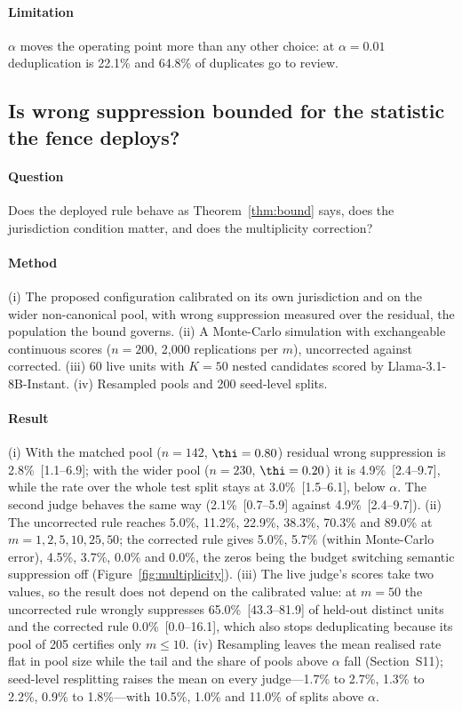 \paragraph{Limitation} $\alpha$ moves the operating point more than any other choice: at $\alpha=0.01$ deduplication is 22.1\% and 64.8\% of duplicates go to review.

\subsection{Is wrong suppression bounded for the statistic the fence deploys?}\label{sec:res-bound}

\paragraph{Question} Does the deployed rule behave as Theorem~\ref{thm:bound} says, does the jurisdiction condition matter, and does the multiplicity correction?

\paragraph{Method} (i) The proposed configuration calibrated on its own jurisdiction and on the wider non-canonical pool, with wrong suppression measured over the residual, the population the bound governs. (ii) A Monte-Carlo simulation with exchangeable continuous scores ($n=200$, 2,000 replications per $m$), uncorrected against corrected. (iii) 60 live units with $K=50$ nested candidates scored by Llama-3.1-8B-Instant. (iv) Resampled pools and 200 seed-level splits.

\paragraph{Result} (i) With the matched pool ($n=142$, $\thi=0.80$) residual wrong suppression is 2.8\%~[1.1--6.9]; with the wider pool ($n=230$, $\thi=0.20$) it is 4.9\%~[2.4--9.7], while the rate over the whole test split stays at 3.0\%~[1.5--6.1], below $\alpha$. The second judge behaves the same way (2.1\%~[0.7--5.9] against 4.9\%~[2.4--9.7]). (ii) The uncorrected rule reaches 5.0\%, 11.2\%, 22.9\%, 38.3\%, 70.3\% and 89.0\% at $m=1,2,5,10,25,50$; the corrected rule gives 5.0\%, 5.7\% (within Monte-Carlo error), 4.5\%, 3.7\%, 0.0\% and 0.0\%, the zeros being the budget switching semantic suppression off (Figure~\ref{fig:multiplicity}). (iii) The live judge's scores take two values, so the result does not depend on the calibrated value: at $m=50$ the uncorrected rule wrongly suppresses 65.0\%~[43.3--81.9] of held-out distinct units and the corrected rule 0.0\%~[0.0--16.1], which also stops deduplicating because its pool of 205 certifies only $m\le10$. (iv) Resampling leaves the mean realised rate flat in pool size while the tail and the share of pools above $\alpha$ fall (Section~S11); seed-level resplitting raises the mean on every judge---1.7\% to 2.7\%, 1.3\% to 2.2\%, 0.9\% to 1.8\%---with 10.5\%, 1.0\% and 11.0\% of splits above $\alpha$.

